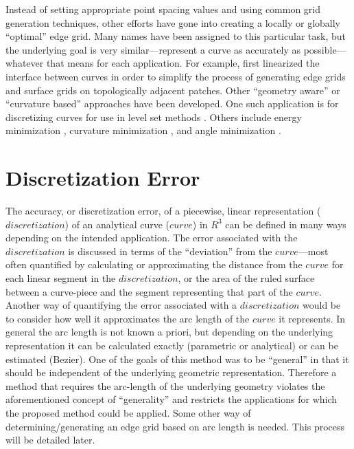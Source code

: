 \documentclass[preprint,12pt]{elsarticle}
\begin{document}
Instead of setting appropriate point spacing values and using common grid generation techniques, other efforts have gone into creating a locally or globally ``optimal'' edge grid.  Many names have been assigned to this particular task, but the underlying goal is very similar—represent a curve as accurately as possible—whatever that means for each application.  For example, \cite{laug04} first linearized the interface between curves in order to simplify the process of generating edge grids and surface grids on topologically adjacent patches.  Other ``geometry aware'' or ``curvature based'' approaches have been developed.  One such application is for discretizing curves for use in level set methods \cite{macklin06}.  Others include energy minimization \cite{hofer04}, curvature minimization \cite{zehiry10}, and angle minimization \cite{ebeida10}.

\section{Discretization Error}
The accuracy, or discretization error, of a piecewise, linear representation ($discretization$) of an analytical curve ($curve$) in $R^3$ can be defined in many ways depending on the intended application.  The error associated with the $discretization$ is discussed in terms of the ``deviation'' from the $curve$—most often quantified by calculating or approximating the distance from the $curve$ for each linear segment in the $discretization$, or the area of the ruled surface between a curve-piece and the segment representing that part of the $curve$.  Another way of quantifying the error associated with a $discretization$ would be to consider how well it approximates the arc length of the $curve$ it represents.  In general the arc length is not known a priori, but depending on the underlying representation it can be calculated exactly (parametric or analytical) or can be estimated (Bezier).  One of the goals of this method was to be “general” in that it should be independent of the underlying geometric representation.  Therefore a method that requires the arc-length of the underlying geometry violates the aforementioned concept of “generality” and restricts the applications for which the proposed method could be applied.  Some other way of determining/generating an edge grid based on arc length is needed.  This process will be detailed later.
\end{document}
